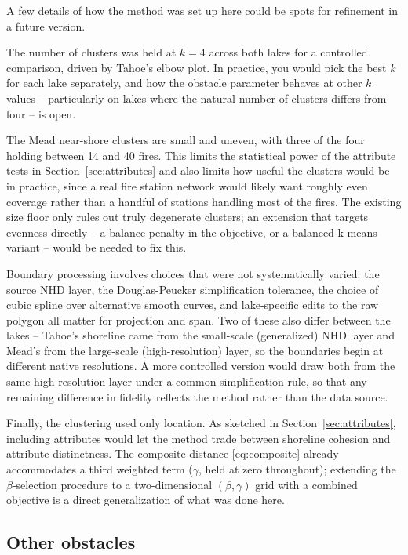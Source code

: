 \documentclass[11pt]{article}
\begin{document}
A few details of how the method was set up here could be spots for refinement in a future version.

The number of clusters was held at $k = 4$ across both lakes for a controlled comparison, driven by Tahoe's elbow plot. In practice, you would pick the best $k$ for each lake separately, and how the obstacle parameter behaves at other $k$ values -- particularly on lakes where the natural number of clusters differs from four -- is open.

The Mead near-shore clusters are small and uneven, with three of the four holding between 14 and 40 fires. This limits the statistical power of the attribute tests in Section~\ref{sec:attributes} and also limits how useful the clusters would be in practice, since a real fire station network would likely want roughly even coverage rather than a handful of stations handling most of the fires. The existing size floor only rules out truly degenerate clusters; an extension that targets evenness directly -- a balance penalty in the objective, or a balanced-k-means variant -- would be needed to fix this.

Boundary processing involves choices that were not systematically varied: the source NHD layer, the Douglas-Peucker simplification tolerance, the choice of cubic spline over alternative smooth curves, and lake-specific edits to the raw polygon all matter for projection and span. Two of these also differ between the lakes -- Tahoe's shoreline came from the small-scale (generalized) NHD layer and Mead's from the large-scale (high-resolution) layer, so the boundaries begin at different native resolutions. A more controlled version would draw both from the same high-resolution layer under a common simplification rule, so that any remaining difference in fidelity reflects the method rather than the data source.

Finally, the clustering used only location. As sketched in Section~\ref{sec:attributes}, including attributes would let the method trade between shoreline cohesion and attribute distinctness. The composite distance \eqref{eq:composite} already accommodates a third weighted term ($\gamma$, held at zero throughout); extending the $\beta$-selection procedure to a two-dimensional $(\beta, \gamma)$ grid with a combined objective is a direct generalization of what was done here.
 
\subsection{Other obstacles}
\label{sec:other-obstacles}
 
\end{document}
